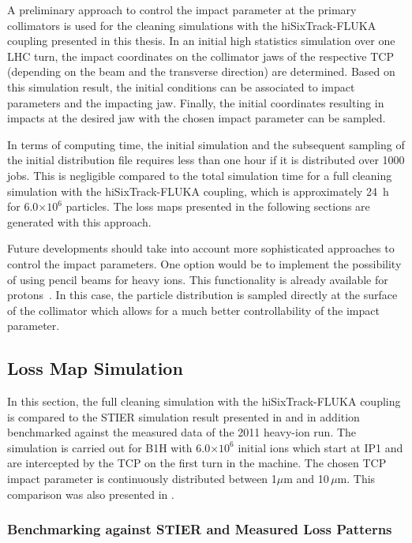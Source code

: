 A preliminary approach to control the impact parameter at the primary collimators is used for the cleaning simulations with the hiSixTrack-FLUKA coupling presented in this thesis. In an initial high statistics simulation over one LHC turn, the impact coordinates on the collimator jaws of the respective TCP (depending on the beam and the transverse direction) are determined. Based on this simulation result, the initial conditions can be associated to impact parameters and the impacting jaw. Finally, the initial coordinates resulting in impacts at the desired jaw with the chosen impact parameter can be sampled. 

In terms of computing time, the initial simulation and the subsequent sampling of the initial distribution file requires less than one hour if it is distributed over 1000 jobs. This is negligible compared to the total simulation time for a full cleaning simulation with the hiSixTrack-FLUKA coupling, which is approximately 24~h for 6.0$\times 10^6$ particles. The loss maps presented in the following sections are generated with this approach.

Future developments should take into account more sophisticated approaches to control the impact parameters. One  option would be to implement the possibility of using pencil beams for heavy ions. This functionality is already available for protons~\cite{Bruce2014}. In this case, the particle distribution is sampled directly at the surface of the collimator which allows for a much better controllability of the impact parameter.



\subsection{Loss Map Simulation} \label{lm:benchmark}


In this section, the full cleaning simulation with the hiSixTrack-FLUKA coupling is compared to the STIER simulation result presented in  and in addition benchmarked against the measured data of the 2011 heavy-ion run. The simulation is carried out for B1H with 6.0$\times 10^6$ initial \lead ions which start at IP1 and are intercepted by the TCP on the first turn in the machine. The chosen TCP impact parameter is continuously distributed between 1$\mu$m and 10$\,\mu$m. This comparison was also presented in \cite{IPAC16:WEPMW029}.

\subsubsection{Benchmarking against STIER and Measured Loss Patterns}

